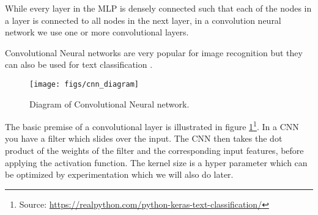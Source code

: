 While every layer in the MLP is densely connected such that each of the nodes in a layer is connected to all nodes in the next layer, in a convolution neural network we use one or more convolutional layers.

Convolutional Neural networks are very popular for image recognition but they can also be used for text classification \cite{textcnn_google}.

\begin{figure}[h!]
  \centering
  \texttt{[image: figs/cnn\_diagram]}
  \caption{Diagram of Convolutional Neural network.}
  \label{cnn}
\end{figure}

The basic premise of a convolutional layer is illustrated in figure \ref{cnn}\footnote{Source: \url{https://realpython.com/python-keras-text-classification/}}. In a CNN you have a filter which slides over the input. The CNN then takes the dot product of the weights of the filter and the corresponding input features, before applying the activation function. The kernel size is a hyper parameter which can be optimized by experimentation which we will also do later.

